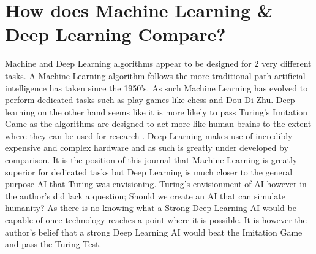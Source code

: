 \documentclass[10pt,a4paper]{scrartcl}
\begin{document}
	\section{How does Machine Learning \& Deep Learning Compare?}
		Machine and Deep Learning algorithms appear to be designed for 2 very different tasks. A Machine Learning algorithm follows the more traditional path artificial intelligence has taken since the 1950's. As such Machine Learning has evolved to perform dedicated tasks such as play games like chess and Dou Di Zhu\cite{SamuelCheckers, ShannonChess, DeepBlue, DouDiZhuMCTS, HearthstoneMCTS}. Deep learning on the other hand seems like it is more likely to pass Turing's Imitation Game\cite{turingComputing} as the algorithms are designed to act more like human brains to the extent where they can be used for research \cite{CrashCourse, DeepLearningSmartwatches, GooglePlayTaipei, huawei}. Deep Learning makes use of incredibly expensive and complex hardware and as such is greatly under developed by comparison. It is the position of this journal that Machine Learning is greatly superior for dedicated tasks but Deep Learning is much closer to the general purpose AI that Turing was envisioning. Turing's envisionment of AI however in the author's did lack a question; Should we create an AI that can simulate humanity? As there is no knowing what a Strong Deep Learning AI would be capable of once technology reaches a point where it is possible. It is however the author's belief that a strong Deep Learning AI would beat the Imitation Game and pass the Turing Test.


	
	
	\newpage
	
	{}
	
\end{document}

